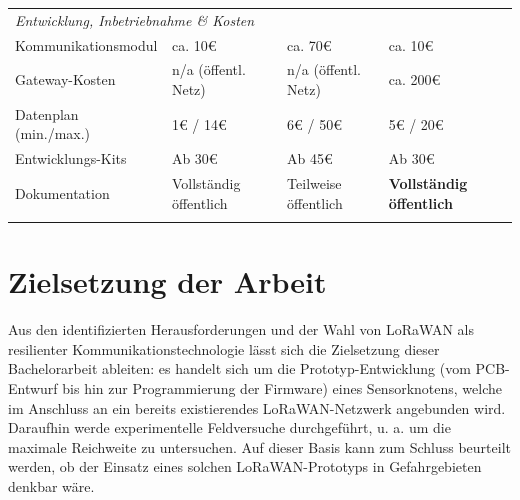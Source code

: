 \begin{table}[htbp]
\begin{tabularx}{\textwidth}{l X X X}
        \multicolumn{4}{l}{\textit{Entwicklung, Inbetriebnahme \& Kosten}} \\
        \addlinespace
        Kommunikationsmodul
            & ca. 10€
            & ca. 70€
            & ca. 10€ \\
        \addlinespace
        Gateway-Kosten
            & n/a (öffentl. Netz)
            & n/a (öffentl. Netz)
            & ca. 200€ \\
        \addlinespace
        Datenplan (min./max.)
            & 1€ / 14€
            & 6€ / 50€
            & 5€ / 20€ \\
        \addlinespace
        Entwicklungs-Kits
            & Ab 30€
            & Ab 45€
            & Ab 30€ \\
        \addlinespace
        Dokumentation
            & Vollständig öffentlich
            & Teilweise öffentlich
            & \textbf{Vollständig öffentlich} \\
        \addlinespace
    \end{tabularx}
\end{table}
\section{Zielsetzung der Arbeit}
Aus den identifizierten Herausforderungen und der Wahl von LoRaWAN als resilienter Kommunikationstechnologie lässt sich
die Zielsetzung dieser Bachelorarbeit ableiten: es handelt sich um die Prototyp-Entwicklung (vom PCB-Entwurf bis hin zur 
Programmierung der Firmware) eines Sensorknotens, welche im Anschluss an ein bereits existierendes LoRaWAN-Netzwerk
angebunden wird. Daraufhin werde experimentelle Feldversuche durchgeführt, u. a. um die maximale Reichweite
zu untersuchen. Auf dieser Basis kann zum Schluss beurteilt werden, ob der Einsatz eines solchen LoRaWAN-Prototyps
in Gefahrgebieten denkbar wäre.   

